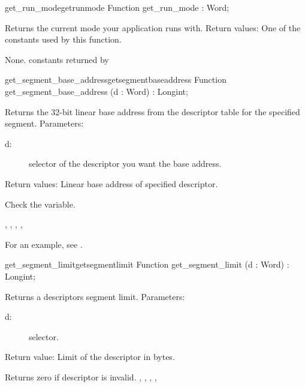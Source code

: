 \begin{functionl}{get\_run\_mode}{getrunmode}
\Declaration
Function get\_run\_mode  : Word;

\Description
Returns the current mode your application runs with.
Return values: One of the constants used by this function.

\Errors
None. 
\SeeAlso
 constants returned by   
\end{functionl}
\html{}
\begin{functionl}{get\_segment\_base\_address}{getsegmentbaseaddress}
\Declaration
Function get\_segment\_base\_address  
(d : Word) : Longint;

\Description
 Returns the 32-bit linear base address from the descriptor table for the
specified segment.
Parameters: 
\begin{description}
\item[d:\ ] selector of the descriptor you want the base address.
\end{description}
Return values: Linear base address of specified descriptor.

\Errors
 Check the  variable.
\SeeAlso

,
, 
,
,

\end{functionl}
For an example, see 
.
\begin{functionl}{get\_segment\_limit}{getsegmentlimit}
\Declaration
Function get\_segment\_limit (d : Word) : Longint;

\Description
Returns a descriptors segment limit.
Parameters:
\begin{description}
\item [d:\ ] selector.
\end{description}
Return value: Limit of the descriptor in bytes.

\Errors
 Returns zero if descriptor is invalid. 
\SeeAlso
{},
, 
,
, 

\end{functionl}
